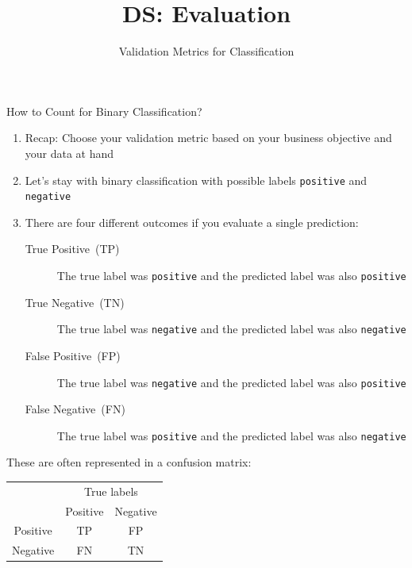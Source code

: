\documentclass[aspectratio=169]{../latex_main/tntbeamer}  %
\title[Evaluation]{DS: Evaluation}
\subtitle{Validation Metrics for Classification}
\begin{document}
	
	\maketitle
	


        \begin{frame}[c]{How to Count for Binary Classification?}
	    \begin{enumerate}
	        \item \alert{Recap}: Choose your validation metric based on your business objective and your data at hand
                \medskip
                \item Let's stay with \alert{binary} classification with possible labels \texttt{positive} and \texttt{negative}
                \item There are four different outcomes if you evaluate a single prediction:
                \begin{description}
                    \item[True Positive~(TP)] The true label was \texttt{positive} and the predicted label was also \texttt{positive}
                    \item[True Negative~(TN)] The true label was \texttt{negative} and the predicted label was also \texttt{negative}
                    \item[False Positive~(FP)] The true label was \texttt{negative} and the predicted label was also \texttt{positive}
                    \item[False Negative~(FN)] The true label was \texttt{positive} and the predicted label was also \texttt{negative}
                \end{description}
	    \end{enumerate}

        These are often represented in a \alert{confusion matrix}:

        \centering
        \begin{tabular}{c|cc}
             & \multicolumn{2}{c}{True labels} \\
             & Positive & Negative \\
             \hline
           Positive & TP & FP \\
           Negative & FN & TN \\
        \end{tabular}

	\end{frame}
\end{document}
